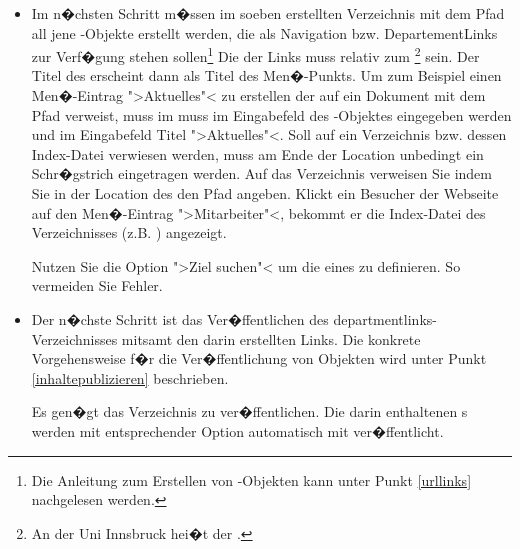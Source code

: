 \begin{itemize}
\item {Im n�chsten Schritt m�ssen im soeben erstellten Verzeichnis mit dem Pfad  all jene  -Objekte erstellt werden, die als Navigation bzw. DepartementLinks zur Verf�gung stehen sollen\footnote{Die Anleitung zum Erstellen von -Objekten kann unter Punkt \ref{urllinks} nachgelesen werden.} 
Die  der Links muss relativ zum \footnote{An der Uni Innsbruck hei�t der  .} sein. Der Titel des  erscheint dann als Titel des Men�-Punkts.
Um zum Beispiel einen Men�-Eintrag ">Aktuelles"< zu erstellen der auf ein Dokument mit dem Pfad  verweist, muss im muss im Eingabefeld  des -Objektes  eingegeben werden und im Eingabefeld Titel ">Aktuelles"<.
Soll auf ein Verzeichnis bzw. dessen Index-Datei verwiesen werden, muss am Ende der Location unbedingt ein Schr�gstrich eingetragen werden. Auf das Verzeichnis  verweisen Sie indem Sie in der Location des  den Pfad  angeben. Klickt ein Besucher der Webseite auf den Men�-Eintrag ">Mitarbeiter"<, bekommt er die Index-Datei des Verzeichnisses  (z.B. ) angezeigt.}

\begin{Hinweis}
Nutzen Sie die Option ">Ziel suchen"< um die  eines  zu definieren. So vermeiden Sie Fehler.
\end{Hinweis}
	
\item {Der n�chste Schritt ist das Ver�ffentlichen des departmentlinks-Verzeichnisses mitsamt den darin erstellten Links. Die konkrete Vorgehensweise f�r die Ver�ffentlichung von Objekten wird unter Punkt \ref{inhaltepublizieren} beschrieben.}

\begin{Hinweis}
  Es gen�gt das Verzeichnis  zu ver�ffentlichen.
  Die darin enthaltenen s werden mit entsprechender
  Option automatisch mit ver�ffentlicht.
\end{Hinweis}


\end{itemize}
